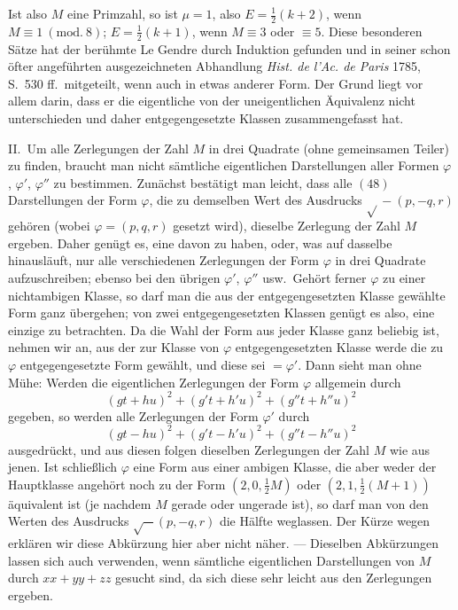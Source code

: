 Ist also $M$ eine Primzahl, so ist $\mu=1$, also $E=\tfrac{1}{2}(k+2)$, wenn
$M\equiv1\ (\mathrm{mod.}\ 8)$; $E=\tfrac{1}{2}(k+1)$, wenn $M\equiv3$ oder $\equiv5$. Diese besonderen Sätze
hat der berühmte Le Gendre durch Induktion gefunden und in seiner
schon öfter angeführten ausgezeichneten Abhandlung \textit{Hist.
de l'Ac. de Paris} 1785, S.\ 530 ff.\ mitgeteilt, wenn auch in etwas
anderer Form. Der Grund liegt vor allem darin, dass er die eigentliche
von der uneigentlichen Äquivalenz nicht unterschieden und daher
entgegengesetzte Klassen zusammengefasst hat.

II.\ Um alle Zerlegungen der Zahl $M$ in drei Quadrate (ohne
gemeinsamen Teiler) zu finden, braucht man nicht sämtliche eigentlichen
Darstellungen aller Formen $\varphi$, $\varphi'$, $\varphi''$ zu bestimmen.
Zunächst bestätigt man leicht, dass alle $(48)$ Darstellungen der
Form $\varphi$, die zu demselben Wert des Ausdrucks $\surd{}-(p,-q,r)$ gehören
(wobei $\varphi=(p,q,r)$ gesetzt wird), dieselbe Zerlegung der Zahl $M$
ergeben. Daher genügt es, eine davon zu haben, oder, was auf dasselbe
hinausläuft, nur alle verschiedenen Zerlegungen der
Form $\varphi$ in drei Quadrate aufzuschreiben; ebenso bei den übrigen
$\varphi'$, $\varphi''$ usw.\ Gehört ferner $\varphi$ zu einer nichtambigen
Klasse, so darf man die aus der entgegengesetzten Klasse gewählte
Form ganz übergehen; von zwei entgegengesetzten Klassen genügt es
also, eine einzige zu betrachten. Da die Wahl der Form aus jeder
Klasse ganz beliebig ist, nehmen wir an, aus der zur Klasse von
$\varphi$ entgegengesetzten Klasse werde die zu $\varphi$ entgegengesetzte
Form gewählt, und diese sei $=\varphi'$. Dann sieht man ohne Mühe:
Werden
die eigentlichen Zerlegungen der Form \(\varphi\) allgemein durch
\[
(gt+hu)^2+(g't+h'u)^2+(g''t+h''u)^2
\]
gegeben, so werden alle Zerlegungen der Form \(\varphi'\) durch
\[
(gt-hu)^2+(g't-h'u)^2+(g''t-h''u)^2
\]
ausgedrückt, und aus diesen folgen dieselben Zerlegungen der Zahl
\(M\) wie aus jenen. Ist schließlich \(\varphi\) eine Form aus einer
ambigen Klasse, die aber weder der Hauptklasse angehört noch zu
der Form \((2,0,\frac12 M)\) oder \((2,1,\frac12(M+1))\) äquivalent ist (je nachdem \(M\)
gerade oder ungerade ist), so darf man von den Werten des Ausdrucks
\(\surd-(p,-q,r)\) die Hälfte weglassen. Der Kürze wegen erklären wir diese
Abkürzung hier aber nicht näher. --- Dieselben Abkürzungen lassen
sich auch verwenden, wenn sämtliche eigentlichen Darstellungen
von \(M\) durch \(xx+yy+zz\) gesucht sind, da sich diese sehr leicht
aus den Zerlegungen ergeben.

